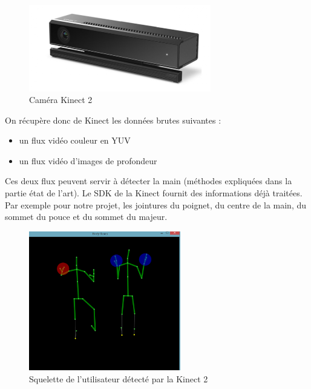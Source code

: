 \begin{figure}[!h]
 \center
 \includegraphics[width=300px]{images/kinect-v2.png}
 \caption{Caméra Kinect 2}
\end{figure}

On récupère donc de Kinect les données brutes suivantes : 
\begin{itemize}
 \item un flux vidéo couleur en YUV
 \item un flux vidéo d'images de profondeur
\end{itemize}

Ces deux flux peuvent servir à détecter la main (méthodes expliquées dans la partie état de l'art).
Le SDK de la Kinect fournit des informations déjà traitées. 
Par exemple pour notre projet, les jointures du poignet, du centre de la main, du sommet du pouce et du sommet du majeur.

\begin{figure}[!h]
\center
\includegraphics[width=250px]{images/kinec2_skel.png}
\caption{Squelette de l'utilisateur détecté par la Kinect 2}
\end{figure}


